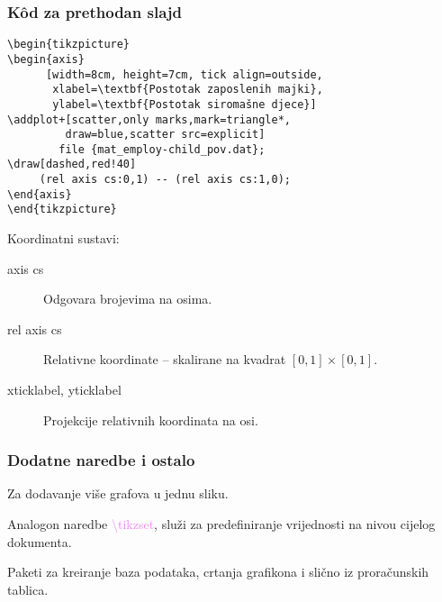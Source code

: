 \documentclass{beamer}
\begin{document}
\begin{frame}[fragile]
\frametitle{K\^od za prethodan slajd}
\small
\begin{lstlisting}
\begin{tikzpicture}
\begin{axis}
      [width=8cm, height=7cm, tick align=outside,
       xlabel=\textbf{Postotak zaposlenih majki},
       ylabel=\textbf{Postotak siromašne djece}]
\addplot+[scatter,only marks,mark=triangle*,
         draw=blue,scatter src=explicit]
        file {mat_employ-child_pov.dat};
\draw[dashed,red!40]
     (rel axis cs:0,1) -- (rel axis cs:1,0);
\end{axis}  
\end{tikzpicture}  
\end{lstlisting}
Koordinatni sustavi:
\begin{description}
  \item[axis cs] Odgovara brojevima na osima.
  \item[rel axis cs] Relativne koordinate -- skalirane na kvadrat $[0,1]\times [0,1]$. 
  \item[xticklabel, yticklabel] Projekcije relativnih koordinata na osi.
\end{description}
\end{frame}

\begin{frame}
\frametitle{Dodatne naredbe i ostalo}
\begin{description}[<+->]
  \item[\textbackslash addplot+] Za dodavanje više grafova u jednu sliku.
  \item[\textbackslash pgfplotset] Analogon naredbe \textcolor{violet}{\textbackslash tikzset}, služi za predefiniranje vrijednosti na nivou cijelog dokumenta. 
  \item[datatool, pgfplotstable, spreadtab] Paketi za kreiranje baza podataka, crtanja grafikona i slično iz proračunskih tablica.
\end{description}
\end{frame}
\end{document}
